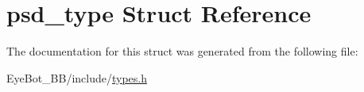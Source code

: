 \hypertarget{structpsd__type}{\section{psd\-\_\-type \-Struct \-Reference}
\label{structpsd__type}
}


\-The documentation for this struct was generated from the following file\-:\begin{DoxyCompactItemize}
\item 
\-Eye\-Bot\-\_\-\-B\-B/include/\hyperlink{types_8h}{types.\-h}\end{DoxyCompactItemize}
